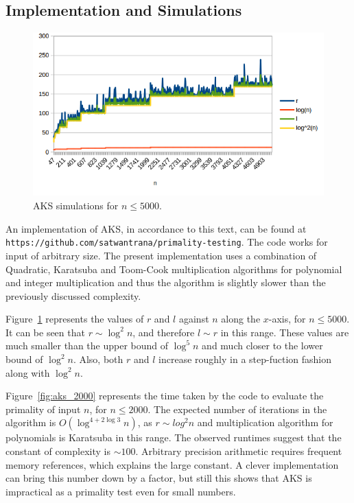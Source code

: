 \documentclass[11pt]{article}
\begin{document}
\subsection{Implementation and Simulations}
\begin{figure}
  \includegraphics[width=\linewidth]{pictures/n-r-l-5000.png}
  \caption{AKS simulations for $n \leq 5000$.}
  \label{fig:aks_5000}
\end{figure}
An implementation of AKS, in accordance to this text, can be found at \\\texttt{https://github.com/satwantrana/primality-testing}. The code works for input of arbitrary size. The present implementation uses a combination of Quadratic, Karatsuba and Toom-Cook multiplication algorithms for polynomial and integer multiplication and thus the algorithm is slightly slower than the previously discussed complexity.

Figure~\ref{fig:aks_5000} represents the values of $r$ and $l$ against $n$ along the $x$-axis, for $n \leq 5000$. It can be seen that $r \sim \log^2 n$, and therefore $l \sim r$ in this range. These values are much smaller than the upper bound of $\log^5 n$ and much closer to the lower bound of $\log^2 n$. Also, both $r$ and $l$ increase roughly in a step-fuction fashion along with $\log^2 n$. 

Figure~\ref{fig:aks_2000} represents the time taken by the code to evaluate the primality of input $n$, for $n \leq 2000$. The expected number of iterations in the algorithm is $O(\log^{4 + 2\log3} n)$, as $r \sim log^2 n$ and multiplication algorithm for polynomials is Karatsuba in this range. The observed runtimes suggest that the constant of complexity is $\sim 100$. Arbitrary precision arithmetic requires frequent memory references, which explains the large constant. A clever implementation can bring this number down by a factor, but still this shows that AKS is impractical as a primality test even for small numbers. 
\end{document}

